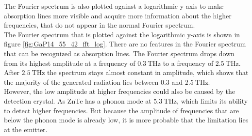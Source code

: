 The Fourier spectrum is also plotted against a logarithmic y-axis to make absorption lines more visible and acquire more information about the higher frequencies, that do not appear in the normal Fourier spectrum.
\\
The Fourier spectrum that is plotted against the logarithmic y-axis is shown in figure \ref{fig:GaP14_55_42_fft_log}.
There are no features in the Fourier spectrum that can be recognized as absorption lines.
The Fourier spectrum drops down from its highest amplitude at a frequency of $\SI{0.3}{\tera\hertz}$ to a frequency of $\SI{2.5}{\tera\hertz}$.
After $\SI{2.5}{\tera\hertz}$ the spectrum stays almost constant in amplitude, which shows that the majority of the generated radiation lies between $0.3$ and $\SI{2.5}{\tera\hertz}$.
\\
However, the low amplitude at higher frequencies could also be caused by the detection crystal.
As ZnTe has a phonon mode at $\SI{5.3}{\tera\hertz}$\cite{phonon_modes}\cite{phonon_ZnTe}, which limits its ability to detect higher frequencies.
But because the amplitude of frequencies that are below the phonon mode is already low, it is more probable that the limitation lies at the emitter.
